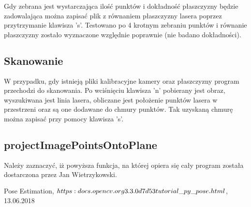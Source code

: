 \documentclass[conference]{IEEEtran}
\begin{document}
Gdy zebrana jest wystarczająca ilość punktów i dokładność płaszczyzny będzie zadowalająca można zapisać plik z równaniem płaszczyzny lasera poprzez przytrzymanie klawisza 's'.
Testowano po 4 krotnym zebraniu punktów i równanie płaszczyzny zostało wyznaczone względnie poprawnie (nie badano dokładności).

\subsection{Skanowanie}

W przypadku, gdy istnieją pliki kalibracyjne kamery oraz płaszczyzny program przechodzi do skanowania. Po wciśnięciu klawisza 'n' pobierany jest obraz, wyszukiwana jest linia lasera, obliczane jest położenie punktów lasera w przestrzeni oraz są one dodawane do chmury punktów. Tak uzyskaną chmurę można zapisać przy pomocy klawisza 's'.

\subsection{projectImagePointsOntoPlane}

Należy zaznaczyć, iż powyższa funkcja, na której opiera się cały program została dostarczona przez Jan Wietrzykowski.

\begin{thebibliography}{00}
Pose Estimation, $https:\/\/docs.opencv.org\/3.3.0\/d7\/d53\/tutorial\_py\_pose.html$, 13.06.2018

\end{thebibliography}
\end{document}
